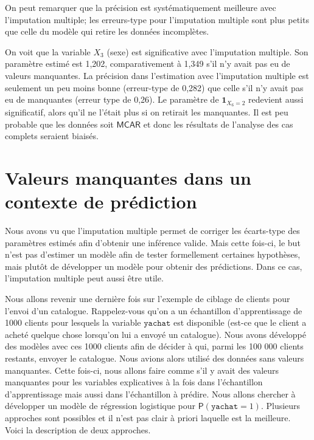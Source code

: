 \documentclass[
  11pt,
  letterpaper,
]{book}
\theoremstyle{definition}
\theoremstyle{definition}
\theoremstyle{definition}
\theoremstyle{remark}
\begin{document}
On peut remarquer que la précision est systématiquement meilleure avec l'imputation multiple; les erreurs-type pour l'imputation multiple sont plus petits que celle du modèle qui retire les données incomplètes.

On voit que la variable \(X_3\) (sexe) est significative avec l'imputation multiple. Son paramètre estimé est 1,202, comparativement à 1,349 s'il n'y avait pas eu de valeurs manquantes. La précision dans l'estimation avec l'imputation multiple est seulement un peu moins bonne (erreur-type de 0,282) que celle s'il n'y avait pas eu de manquantes (erreur type de 0,26). Le paramètre de \({\mathbf 1}_{X_6=2}\) redevient aussi significatif, alors qu'il ne l'était plus si on retirait les manquantes. Il est peu probable que les données soit \(\mathsf{MCAR}\) et donc les résultats de l'analyse des cas complets seraient biaisés.

\hypertarget{valeurs-manquantes-dans-un-contexte-de-pruxe9diction}{%
\section{Valeurs manquantes dans un contexte de prédiction}\label{valeurs-manquantes-dans-un-contexte-de-pruxe9diction}}

Nous avons vu que l'imputation multiple permet de corriger les écarts-type des paramètres estimés afin d'obtenir une inférence valide. Mais cette fois-ci, le but n'est pas d'estimer un modèle afin de tester formellement certaines hypothèses, mais plutôt de développer un modèle pour obtenir des prédictions. Dans ce cas, l'imputation multiple peut aussi être utile.

Nous allons revenir une dernière fois sur l'exemple de ciblage de clients pour l'envoi d'un catalogue. Rappelez-vous qu'on a un échantillon d'apprentissage de 1000 clients pour lesquels la variable \(\texttt{yachat}\) est disponible (est-ce que le client a acheté quelque chose lorsqu'on lui a envoyé un catalogue). Nous avons développé des modèles avec ces 1000 clients afin de décider à qui, parmi les 100 000 clients restants, envoyer le catalogue. Nous avions alors utilisé des données sans valeurs manquantes. Cette fois-ci, nous allons faire comme s'il y avait des valeurs manquantes pour les variables explicatives à la fois dans l'échantillon d'apprentissage mais aussi dans l'échantillon à prédire. Nous allons chercher à développer un modèle de régression logistique pour \({\mathsf P}\left(\texttt{yachat}=1\right)\). Plusieurs approches sont possibles et il n'est pas clair à priori laquelle est la meilleure. Voici la description de deux approches.
\end{document}
